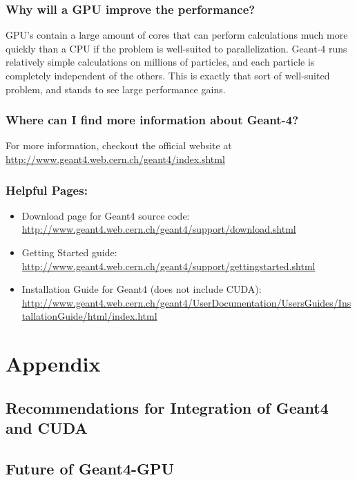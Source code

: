 \documentclass[12pt]{article}
\begin{document}
\subsubsection{Why will a GPU improve the performance?}
GPU's contain a large amount of cores that can perform calculations much more quickly than a CPU if the problem is well-suited to parallelization. Geant-4 runs relatively simple calculations on millions of particles, and each particle is completely independent of the others. This is exactly that sort of well-suited problem, and stands to see large performance gains.

\subsubsection{Where can I find more information about Geant-4?}
For more information, checkout the official website at \url{http://www.geant4.web.cern.ch/geant4/index.shtml}

\subsubsection{Helpful Pages:}
\begin{itemize}
\item Download page for Geant4 source code: \url{http://www.geant4.web.cern.ch/geant4/support/download.shtml}
\item Getting Started guide: \url{http://www.geant4.web.cern.ch/geant4/support/gettingstarted.shtml}
\item Installation Guide for Geant4 (does not include CUDA): \url{http://www.geant4.web.cern.ch/geant4/UserDocumentation/UsersGuides/InstallationGuide/html/index.html}
\end{itemize}

\section{Appendix} %
\subsection{Recommendations for Integration of Geant4 and CUDA}
\subsection{Future of Geant4-GPU}
\end{document}
